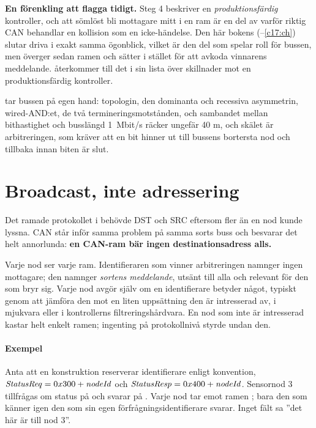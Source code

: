 \begin{aside}
\textbf{En förenkling att flagga tidigt.} Steg 4 beskriver en \emph{produktionsfärdig} kontroller,
och att sömlöst bli mottagare mitt i en ram är en del av varför riktig CAN behandlar en kollision
som en icke-händelse. Den här bokens  (--\ref{c17:ch}) slutar
driva i exakt samma ögonblick, vilket är den del som spelar roll för bussen, men överger sedan ramen
och sätter  i stället för att avkoda vinnarens meddelande. 
återkommer till det i sin lista över skillnader mot en produktionsfärdig kontroller.
\end{aside}

 tar bussen på egen hand: topologin, den dominanta och recessiva asymmetrin,
wired-AND:et, de två termineringsmotstånden, och sambandet mellan bithastighet och busslängd
\textemdash{} 1~Mbit/s räcker ungefär 40 m, och skälet är arbitreringen, som kräver att en bit hinner
ut till bussens bortersta nod och tillbaka innan biten är slut.

\section{Broadcast, inte adressering}
\label{c10:sec:broadcast}

Det ramade protokollet i  behövde DST och SRC eftersom fler än en nod kunde
lyssna. CAN står inför samma problem på samma sorts buss och besvarar det helt annorlunda: \textbf{en
CAN-ram bär ingen destinationsadress alls.}

Varje nod ser varje ram. Identifieraren som vinner arbitreringen namnger ingen mottagare; den
namnger \emph{sortens meddelande}, utsänt till alla och relevant för den som bryr sig. Varje nod
avgör själv om en identifierare betyder något, typiskt genom att jämföra den mot en liten uppsättning
den är intresserad av, i mjukvara eller i kontrollerns filtreringshårdvara. En nod som inte är
intresserad kastar helt enkelt ramen; ingenting på protokollnivå styrde undan den.

\paragraph{Exempel}
Anta att en konstruktion reserverar identifierare enligt konvention,
$\mathit{StatusReq} = \code{0x300} + \mathit{nodeId}$ och
$\mathit{StatusResp} = \code{0x400} + \mathit{nodeId}$. Sensornod 3 tillfrågas om status på
 och svarar på . Varje nod tar emot ramen ; bara den som känner
igen den som sin egen förfrågningsidentifierare svarar. Inget fält sa ”det här är till nod 3”.

